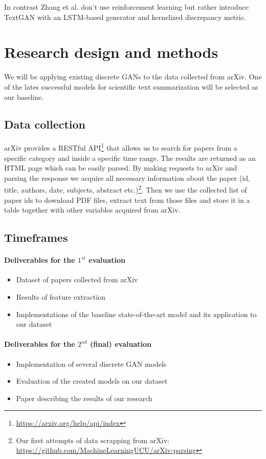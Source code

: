 \documentclass[sigplan]{acmart}
\begin{document}
In contrast Zhang et al.\cite{zhang-17} don't use reinforcement learning but rather introduce TextGAN with an LSTM-based generator and kernelized discrepancy metric.

\section{Research design and methods}

We will be applying existing discrete GANs to the data collected from arXiv. One of the lates successful models  for scientific text summarization will be selected as our baseline.

\subsection{Data collection}

arXiv provides a RESTful API\footnote{\url{https://arxiv.org/help/api/index}} that allows us to search for papers from a specific category and inside a specific time range. The results are returned as an HTML page which can be easily parsed. By making requests to arXiv and parsing the response we acquire all necessary information about the paper (id, title, authors, date, subjects, abstract etc.)\footnote{Our first attempts of data scrapping from arXiv:\\ \url{https://github.com/MachineLearningUCU/arXiv-parsing}}. Then we use the collected list of paper ids to download PDF files, extract text from those files and store it in a table together with other variables acquired from arXiv.

\subsection{Timeframes}

\paragraph{Deliverables for the $1^{st}$ evaluation}
\begin{itemize}
\item Dataset of papers collected from arXiv
\item Results of feature extraction
\item Implementations of the baseline state-of-the-art model and its application to our dataset
\end{itemize}

\paragraph{Deliverables for the $2^{nd}$ (final) evaluation}
\begin{itemize}
\item Implementation of several discrete GAN models
\item Evaluation of the created models on our dataset
\item Paper describing the results of our research
\end{itemize}
\end{document}
